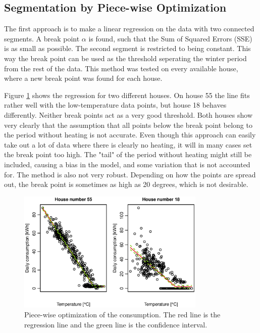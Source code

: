 \subsection{Segmentation by Piece-wise Optimization}
The first approach is to make a linear regression on the data with two connected segments. A break point
$\alpha$ is found, such that the Sum of Squared Errors (SSE) is as small as possible. The second segment is restricted to
being constant. This way the break point can be used as the threshold seperating the winter period from the rest of the data. This method was tested on every available
house, where a new break point was found for each house.

\noindent Figure \ref{fig: Consumption-PW} shows the regression for two different houses. On house 55 the
line fits rather well with the low-temperature data points, but house 18 behaves differently. Neither break points act as a very good threshold. Both houses show very clearly that the assumption that all points below the break point belong to the period without heating is not accurate. Even though this approach can easily take out a lot of data
where there is clearly no heating, it will in many cases set the break point too high. The "tail" of the period without heating might still be included, causing a bias in the model, and some variation that is not accounted for. The method is also not very robust. Depending on how the points are spread out, the break point is sometimes as high as 20 degrees, which is not desirable.
\begin{figure}[H]
    \centering
    \includegraphics[width=0.8\textwidth]{../../../figures/Consumption_PW.eps}
    \caption{Piece-wise optimization of the consumption. The red line is the regression line and the green line is the confidence interval.}
    \label{fig: Consumption-PW}
\end{figure}


